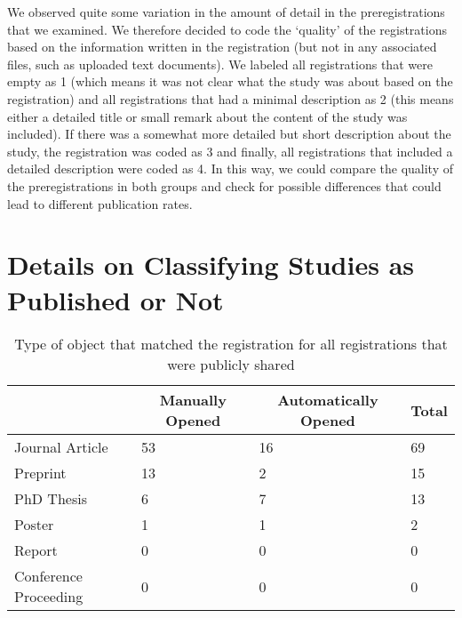\documentclass[
  ,jou, a4paper,floatsintext]{apa6}
\begin{document}
We observed quite some variation in the amount of detail in the preregistrations that we examined. We therefore decided to code the `quality' of the registrations based on the information written in the registration (but not in any associated files, such as uploaded text documents). We labeled all registrations that were empty as 1 (which means it was not clear what the study was about based on the registration) and all registrations that had a minimal description as 2 (this means either a detailed title or small remark about the content of the study was included). If there was a somewhat more detailed but short description about the study, the registration was coded as 3 and finally, all registrations that included a detailed description were coded as 4. In this way, we could compare the quality of the preregistrations in both groups and check for possible differences that could lead to different publication rates.

\hypertarget{details-on-classifying-studies-as-published-or-not}{%
\section{Details on Classifying Studies as Published or Not}\label{details-on-classifying-studies-as-published-or-not}}

\begin{table*}[tbp]

\begin{center}
\begin{threeparttable}

\caption{\label{tab:publicationtype}Type of object that matched the registration for all registrations that were publicly shared}

\begin{tabular}{llll}
\toprule
 & \multicolumn{1}{c}{Manually Opened} & \multicolumn{1}{c}{Automatically Opened} & \multicolumn{1}{c}{Total}\\
\midrule
Journal Article & 53 & 16 & 69\\
Preprint & 13 & 2 & 15\\
PhD Thesis & 6 & 7 & 13\\
Poster & 1 & 1 & 2\\
Report & 0 & 0 & 0\\
Conference Proceeding & 0 & 0 & 0\\
\bottomrule
\end{tabular}

\end{threeparttable}
\end{center}

\end{table*}
\end{document}

